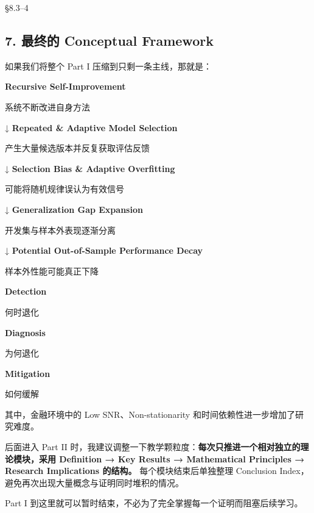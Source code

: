 §8.3--4

\hypertarget{part-1-10-0001-ux6700ux7ec8ux7684-conceptual-framework}{%
\subsection{7. 最终的 Conceptual Framework}\label{part-1-10-0001-ux6700ux7ec8ux7684-conceptual-framework}}

如果我们将整个 Part I 压缩到只剩一条主线，那就是：

\textbf{Recursive Self-Improvement}

系统不断改进自身方法

↓ \textbf{Repeated \& Adaptive Model Selection}

产生大量候选版本并反复获取评估反馈

↓ \textbf{Selection Bias \& Adaptive Overfitting}

可能将随机规律误认为有效信号

↓ \textbf{Generalization Gap Expansion}

开发集与样本外表现逐渐分离

↓ \textbf{Potential Out-of-Sample Performance Decay}

样本外性能可能真正下降

\textbf{Detection}

何时退化

\textbf{Diagnosis}

为何退化

\textbf{Mitigation}

如何缓解

其中，金融环境中的 Low SNR、Non-stationarity 和时间依赖性进一步增加了研究难度。

后面进入 Part II 时，我建议调整一下教学颗粒度：\textbf{每次只推进一个相对独立的理论模块，采用 Definition → Key Results → Mathematical Principles → Research Implications 的结构。} 每个模块结束后单独整理 Conclusion Index，避免再次出现大量概念与证明同时堆积的情况。

Part I 到这里就可以暂时结束，不必为了完全掌握每一个证明而阻塞后续学习。
